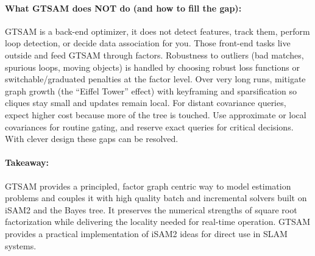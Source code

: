 \paragraph{What GTSAM does NOT do (and how to fill the gap):}
GTSAM is a back-end optimizer, it does not detect features, track them, perform loop detection, or decide data association for you. Those front-end tasks live outside and feed GTSAM through factors. Robustness to outliers (bad matches, spurious loops, moving objects) is handled by choosing robust loss functions or switchable/graduated penalties at the factor level. Over very long runs, mitigate graph growth (the ``Eiffel Tower'' effect) with keyframing and sparsification so cliques stay small and updates remain local. For distant covariance queries, expect higher cost because more of the tree is touched. Use approximate or local covariances for routine gating, and reserve exact queries for critical decisions. With clever design these gaps can be resolved. \cite{GTSAM_handbook}

\paragraph{Takeaway:}
GTSAM provides a principled, factor graph centric way to model estimation problems and couples it with high quality batch and incremental solvers built on iSAM2 and the Bayes tree. It preserves the numerical strengths of square root factorization while delivering the locality needed for real-time operation. GTSAM provides a practical implementation of iSAM2 ideas for direct use in SLAM systems. \cite{GTSAM_handbook}


